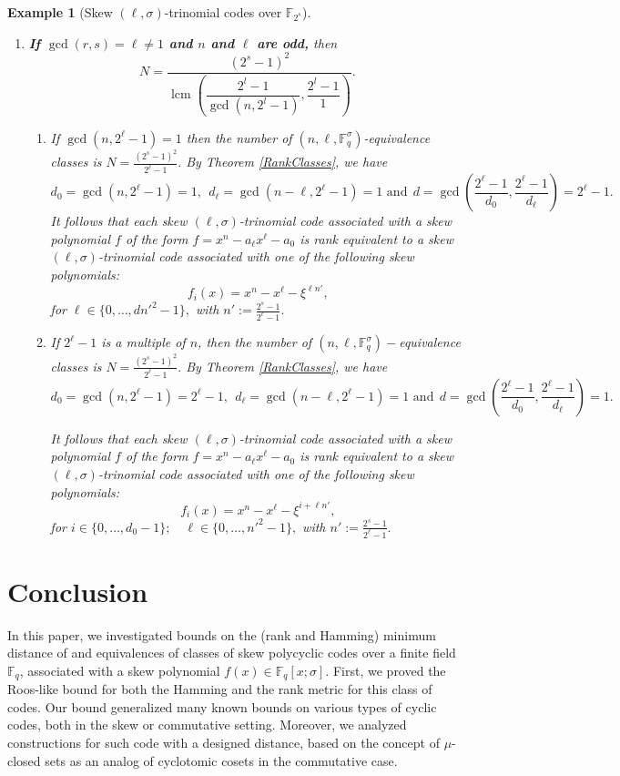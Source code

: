\documentclass[12pt,paper]{article}
\theoremstyle{plain}
\newtheorem{example}[theorem]{Example}
\newcommand{\Fq}{\mathbb{F}_{q}}
\DeclareMathOperator{\lcm}{lcm}
\begin{document}
\begin{example}[Skew $(\ell,\sigma)$-trinomial codes over $ \mathbb{F}_{2^s}$]
\begin{enumerate}
\item \textbf{If $\gcd(r,s)= \ell\neq 1$ and $n$ and $ \ell$ are  odd,} then
$$ N=\dfrac{(2^s-1)^2}{ \lcm\left(\dfrac{2^{l}-1}{ \gcd(n, 2^{l}-1) }, \dfrac{2^{l}-1}{1}  \right)}.$$
\begin{enumerate}
    \item If $ \gcd(n, 2^{\ell}-1)=1  $ then the number of $( n,\ell, \Fq^{\sigma})$-equivalence classes is $ \displaystyle{N =\frac{(2^s-1)^2}{2^{\ell}-1}.} $
By Theorem \ref{RankClasses}, we have 
     $$d_0=\gcd( n, 2^{\ell}-1)= 1,\ \ d_{\ell}= \gcd( n-\ell, 2^{\ell}-1)= 1 \text{ and} \ \  d=\gcd\left( \frac{ 2^{\ell}-1}{d_0}, \frac{2^{\ell}-1}{d_{\ell}}\right)=
     2^{\ell}-1.$$
 It follows that each  skew $(\ell,\sigma)$-trinomial  code associated with a skew  polynomial $f$ of the form  $f =x^{n}- a_{\ell} x^{\ell}-a_0$ is rank equivalent to a skew $(\ell,\sigma)$-trinomial  code  associated with one of the following  skew polynomials: 
  $$f_i(x)= x^n- x^{\ell}- \xi^{\ell n'},$$
  for $\ell \in \{ 0,\ldots, d n'^2-1\},$ with $ n':= \frac{2^s-1}{2^{\ell}-1}.$
  \item If $ 2^{\ell}-1  $ is a multiple of $n$, then the number of $( n,\ell, \Fq^{\sigma})-$equivalence classes is $ \displaystyle{N =\frac{(2^s-1)^2}{2^{\ell}-1}.} $
By Theorem \ref{RankClasses}, we have 
     $$d_0=\gcd( n, 2^{\ell}-1)= 2^{\ell}-1,\ \ d_{\ell}= \gcd( n-\ell, 2^{\ell}-1)= 1 \text{ and} \ \  d=\gcd\left( \frac{ 2^{\ell}-1}{d_0}, \frac{2^{\ell}-1}{d_{\ell}}\right)=1.$$
     
 It follows that each  skew $(\ell,\sigma)$-trinomial  code associated with a skew  polynomial $f$ of the form  $f =x^{n}- a_{\ell} x^{\ell}-a_0$ is rank equivalent to a skew $(\ell,\sigma)$-trinomial  code  associated with one of the following  skew polynomials: 
  $$f_i(x)= x^n- x^{\ell}- \xi^{i+\ell n'},$$
  for $i \in \{ 0,\ldots,d_0-1\} ;\quad \ell \in \{ 0,\ldots,n'^2-1\},$ with $ n':= \frac{2^s-1}{2^{\ell}-1}.$
\end{enumerate}

 \end{enumerate}
\end{example}




\section*{Conclusion}
In this paper, we investigated bounds on the (rank and Hamming) minimum distance of and equivalences of classes of skew polycyclic codes over a finite field $\mathbb{F}_q$, associated with a skew polynomial $f(x) \in \mathbb{F}_q[x;\sigma]$. First, we proved the Roos-like bound for both the Hamming and the rank metric for this class of codes. Our bound generalized many known bounds on various types of cyclic codes, both in the skew or commutative setting. Moreover, we analyzed constructions for such code with a designed distance, based on the concept of $\mu$-closed sets as an analog of cyclotomic cosets in the commutative case. 
\end{document}
